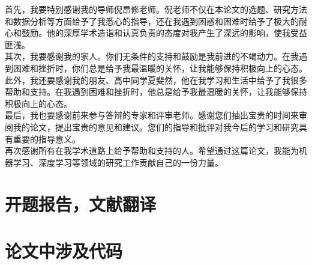 \documentclass[12pt,a4paper]{amsart}
\begin{document}
首先，我要特别感谢我的导师倪昂修老师。倪老师不仅在本论文的选题、研究方法和数据分析等方面给予了我悉心的指导，还在我遇到困惑和困难时给予了极大的耐心和鼓励。他的深厚学术造诣和认真负责的态度对我产生了深远的影响，使我受益匪浅。\\

其次，我要感谢我的家人。你们无条件的支持和鼓励是我前进的不竭动力。在我遇到困难和挫折时，你们总是给予我最温暖的关怀，让我能够保持积极向上的心态。\\

此外，我还要感谢我的朋友、高中同学夏斐然，他在我学习和生活中给予了我很多帮助和支持。在我遇到困难和挫折时，他总是给予我最温暖的关怀，让我能够保持积极向上的心态。\\

最后，我也要感谢前来参与答辩的专家和评审老师。感谢您们抽出宝贵的时间来审阅我的论文，提出宝贵的意见和建议。您们的指导和批评对我今后的学习和研究具有重要的指导意义。\\

再次感谢所有在我学术道路上给予帮助和支持的人。希望通过这篇论文，我能为机器学习、深度学习等领域的研究工作贡献自己的一份力量。

\appendix

\section{开题报告，文献翻译}

\section{论文中涉及代码}


{\footnotesize}
\end{document}
